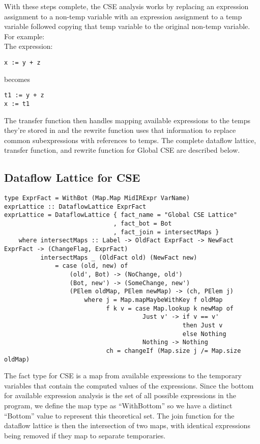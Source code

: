 \documentclass[11pt]{article}
\begin{document}
With these steps complete, the CSE analysis works by replacing an expression assignment to a non-temp variable with an expression assignment to a temp variable followed copying that temp variable to the original non-temp variable. For example:\\


\noindent The expression: 
\begin{verbatim}
x := y + z
\end{verbatim}

\noindent becomes 

\begin{verbatim}
t1 := y + z
x := t1
\end{verbatim}

The transfer function then handles mapping available expressions to the temps they're stored in and the rewrite function uses that information to replace common subexpressions with references to temps. The complete dataflow lattice, transfer function, and rewrite function for Global CSE are described below. 

\subsection {Dataflow Lattice for CSE }

{\small\begin{verbatim}
type ExprFact = WithBot (Map.Map MidIRExpr VarName)
exprLattice :: DataflowLattice ExprFact 
exprLattice = DataflowLattice { fact_name = "Global CSE Lattice"
                              , fact_bot = Bot
                              , fact_join = intersectMaps }
    where intersectMaps :: Label -> OldFact ExprFact -> NewFact ExprFact -> (ChangeFlag, ExprFact)
          intersectMaps _ (OldFact old) (NewFact new) 
              = case (old, new) of 
                  (old', Bot) -> (NoChange, old') 
                  (Bot, new') -> (SomeChange, new') 
                  (PElem oldMap, PElem newMap) -> (ch, PElem j)
                      where j = Map.mapMaybeWithKey f oldMap
                            f k v = case Map.lookup k newMap of 
                                      Just v' -> if v == v' 
                                                 then Just v 
                                                 else Nothing
                                      Nothing -> Nothing 
                            ch = changeIf (Map.size j /= Map.size oldMap)
\end{verbatim}}

The fact type for CSE is a map from available expressions to the temporary variables that contain the computed values of the expressions. Since the bottom for available expression analysis is the set of all possible expressions in the program, we define the map type as ``WithBottom'' so we have a distinct ``Bottom'' value to represent this theoretical set. The join function for the dataflow lattice is then the intersection of two maps, with identical expressions being removed if they map to separate temporaries. 
\end{document}
